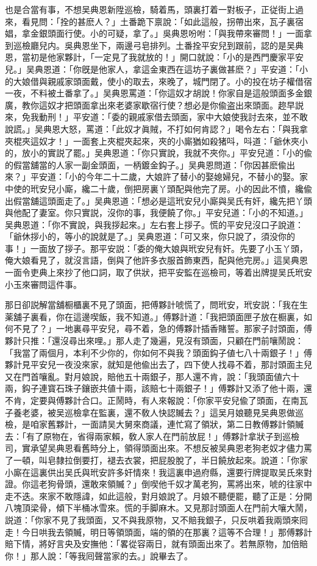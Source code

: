 也是合當有事，不想吴典恩新陞巡檢，騎着馬，頭裏打着一對板子，正従街上過來，看見問：「拴的甚麽人？」土番跪下禀說：「如此這般，拐帶出來，瓦子裏宿娼，拿金銀頭面行使。小的可疑，拿了。」吳典恩吩咐：「與我帶來審問！」一面拿到巡檢廳兒内。吳典恩坐下，兩邊弓皂排列。土番拴平安兒到跟前，認的是吴典恩，當初是他家夥計，「一定見了我就放的！」開口就說：「小的是西門慶家平安兒。」吴典恩道：「你旣是他家人，拿這金東西在這坊子裏做甚麽？」平安道：「小的大娘借與親戚家頭面戴，使小的取去，來晚了，城門閉了。小的投在坊子權借宿一夜，不料被土番拿了。」吴典恩罵道：「你這奴才胡說！你家自是這般頭面多金銀廣，教你這奴才把頭面拿出來老婆家歇宿行使？想必是你偸盗出來頭面。趂早説來，免我動刑！」平安道：「委的親戚家借去頭面，家中大娘使我討去來，並不敢說謊。」吴典恩大怒，罵道：「此奴才眞賊，不打如何肯認？」喝令左右：「與我拿夾棍夾這奴才！」一面套上夾棍夾起來，夾的小廝猶如殺猪呌，呌道：「爺休夾小的，放小的實説了罷。」吴典恩道：「你只實說，我就不夾你。」平安兒道：「小的偸的假當舖當的人家一副金頭面，一柄鍍金鈎子。」吴典恩問道：「你因甚麽偸出來？」平安道：「小的今年二十二歲，大娘許了替小的娶媳婦兒，不替小的娶。家中使的玳安兒小廝，纔二十歲，倒把房裏丫頭配與他完了房。小的因此不憤，纔偸出假當舖這頭面走了。」吴典恩道：「想必是這玳安兒小廝與吴氏有奸，纔先把丫頭與他配了妻室。你只實説，沒你的事，我便饒了你。」平安兒道：「小的不知道。」吴典恩道：「你不實說，與我拶起來。」左右套上拶子。慌的平安兒沒口子說道：「爺休拶小的，等小的說就是了。」吴典恩道：「可又來，你只說了，須没你的事！」一面放了拶子。那平安説：「委的俺大娘與玳安兒有奸。先要了小玉丫頭，俺大娘看見了，就沒言語，倒與了他許多衣服首飾東西，配與他完房。」這吴典恩一面令吏典上來抄了他口詞，取了供狀，把平安監在巡檢司，等着出牌提吴氏玳安小玉來審問這件事。

那日卻説解當舖橱櫃裏不見了頭面，把傅夥計唬慌了，問玳安，玳安説：「我在生薬舖子裏看，你在這邊喫飯，我不知道。」傅夥計道：「我把頭面匣子放在橱裏，如何不見了？」一地裏尋平安兒，尋不着，急的傅夥計插香賭誓。那家子討頭面，傅夥計只推：「還沒尋出來哩。」那人走了幾遍，見沒有頭面，只顧在門前嚷鬧說：「我當了兩個月，本利不少你的，你如何不與我？頭面鈎子値七八十兩銀子！」傅夥計見平安兒一夜没來家，就知是他偸出去了，四下使人找尋不着，那討頭面主兒又在門首嚷亂。對月娘說，賠他五十兩銀子，那人還不肯，說：「我頭面値六十兩，鈎子連寳石珠子鑲嵌共値十兩，該賠七十兩銀子！」傅夥計又添了他十兩，還不肯，定要與傅夥計合口。正鬧時，有人來報說：「你家平安兒偸了頭面，在南瓦子養老婆，被吴巡檢拿在監裏，還不敎人快認贓去？」這吴月娘聽見吴典恩做巡檢，是咱家舊夥計，一面請吴大舅來商議，連忙寫了領狀，第二日教傅夥計領贓去：「有了原物在，省得兩家賴，敎人家人在門前放屁！」傅夥計拿狀子到巡檢司，實承望吴典恩看舊時分上，領得頭面出來。不想反被吴典恩老狗老奴才儘力罵了一頓，叫皂隸拉倒要打，褪去衣裳，把屁股脫了，半日饒放起來。說道：「你家小廝在這裏供出吴氏與玳安許多奸情來！我這裏申過府縣，還要行牌提取吴氏來對證。你這老狗骨頭，還敢來領贓？」倒喫他千奴才萬老狗，罵將出來，唬的往家中走不迭。來家不敢隱諱，如此這般，對月娘說了。月娘不聽便罷，聽了正是：分開八塊頂梁骨，傾下半桶冰雪來。慌的手脚麻木。又見那討頭面人在門前大嚷大鬧，説道：「你家不見了我頭面，又不與我原物，又不賠我銀子，只反哄着我兩頭來囘走！今日哄我去領贓，明日等領頭面，端的領的在那裏？這等不合理！」那傅夥計賠下情，將好言央及安撫他：「畧從容兩日，就有頭面出來了。若無原物，加倍賠你！」那人說：「等我囘聲當家的去。」說畢去了。

